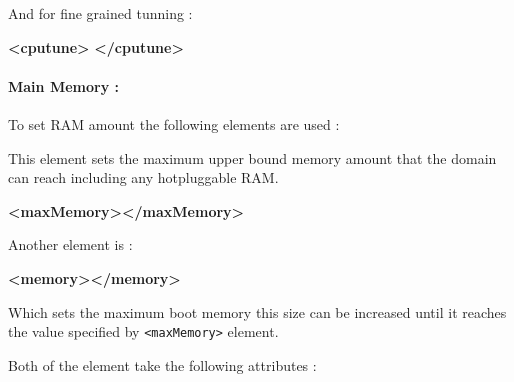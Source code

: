 \documentclass[
  14pt,
  english,
  a4paper,
]{scrreprt}
\newenvironment{Shaded}{}{}
\newcommand{\KeywordTok}[1]{\textcolor[rgb]{0.00,0.44,0.13}{\textbf{#1}}}
\begin{document}
And for fine grained tunning :

\begin{Shaded}
\begin{Highlighting}[]
\KeywordTok{\textless{}cputune\textgreater{}}
\KeywordTok{\textless{}/cputune\textgreater{}}
\end{Highlighting}
\end{Shaded}

\hypertarget{main-memory-2}{%
\paragraph*{Main Memory :}\label{main-memory-2}}

To set RAM amount the following elements are used :

This element sets the maximum upper bound memory amount that the domain
can reach including any hotpluggable RAM.

\begin{Shaded}
\begin{Highlighting}[]
\KeywordTok{\textless{}maxMemory\textgreater{}\textless{}/maxMemory\textgreater{}}
\end{Highlighting}
\end{Shaded}

Another element is :

\begin{Shaded}
\begin{Highlighting}[]
\KeywordTok{\textless{}memory\textgreater{}\textless{}/memory\textgreater{}}
\end{Highlighting}
\end{Shaded}

Which sets the maximum boot memory this size can be increased until it
reaches the value specified by
\texttt{\textless{}maxMemory\textgreater{}} element.

Both of the element take the following attributes :
\end{document}
